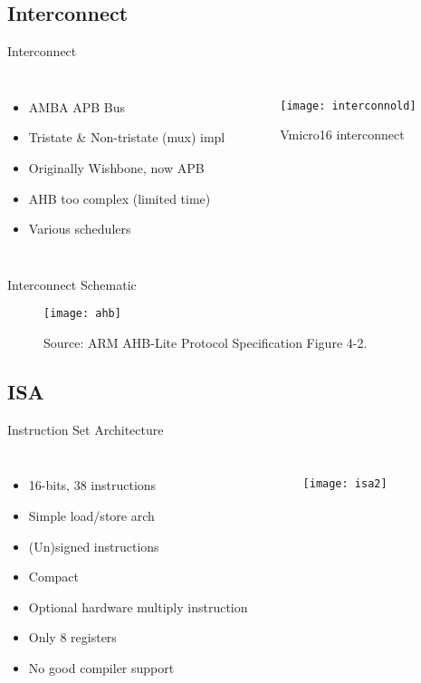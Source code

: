 \documentclass[aspectratio=169]{beamer}
\newcommand\pro{\item[$+$]}
\newcommand\con{\item[$-$]}
\begin{document}
\subsection{Interconnect}
\begin{frame}{Interconnect}
\begin{columns}[t]
\begin{itemize}
    \item AMBA APB Bus
    \item Tristate \& Non-tristate (mux) impl
    \item Originally Wishbone, now APB
    \item AHB too complex (limited time)
    \item Various schedulers
\end{itemize}
\begin{figure}
    \centering
    \texttt{[image: interconnold]}
    \caption{Vmicro16 interconnect}
    \label{fig:my_label}
\end{figure}
\end{columns}
\end{frame}

\begin{frame}{Interconnect Schematic}
    \begin{figure}
        \centering
        \texttt{[image: ahb]}
        \caption{Source: ARM AHB-Lite Protocol Specification Figure 4-2.}
        \label{fig:my_label}
    \end{figure}
\end{frame}

\subsection{ISA}
\begin{frame}{Instruction Set Architecture}
    
\begin{columns}[t]
\begin{itemize}
    \pro 16-bits, 38 instructions
    \pro Simple load/store arch
    \pro (Un)signed instructions
    \pro Compact
    \pro Optional hardware multiply instruction\\
    
    \con Only 8 registers
    \con No good compiler support
\end{itemize}
\vspace{-2cm}
\begin{figure}
    \centering
    \texttt{[image: isa2]}
\end{figure}
\end{columns}
\end{frame}
\end{document}
